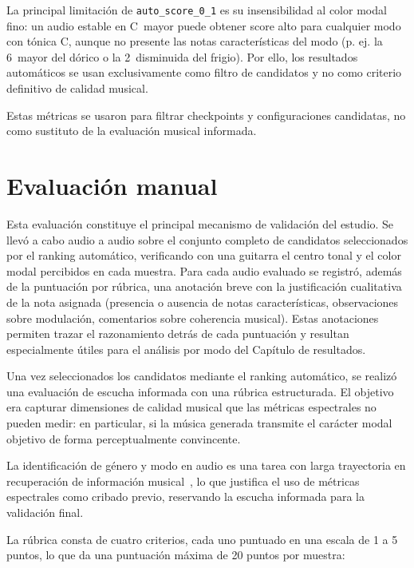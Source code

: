 \documentclass[%
    school=etsisi,%
    type=pfg,%
    degree=61CD,%
]{upm-report}
\begin{document}
La principal limitaci\'on de \texttt{auto\_score\_0\_1} es su insensibilidad al color modal fino: un audio estable en C~mayor puede obtener score alto para cualquier modo con t\'onica C, aunque no presente las notas caracter\'isticas del modo (p. ej. la 6\textordfeminine~mayor del d\'orico o la 2\textordfeminine~disminuida del frigio). Por ello, los resultados autom\'aticos se usan exclusivamente como filtro de candidatos y no como criterio definitivo de calidad musical.

Estas m\'etricas se usaron para filtrar checkpoints y configuraciones candidatas, no como sustituto de la evaluaci\'on musical informada.

\section{Evaluaci\'on manual}

Esta evaluaci\'on constituye el principal mecanismo de validaci\'on del estudio. Se llev\'o a cabo audio a audio sobre el conjunto completo de candidatos seleccionados por el ranking autom\'atico, verificando con una guitarra el centro tonal y el color modal percibidos en cada muestra. Para cada audio evaluado se registr\'o, adem\'as de la puntuaci\'on por r\'ubrica, una anotaci\'on breve con la justificaci\'on cualitativa de la nota asignada (presencia o ausencia de notas caracter\'isticas, observaciones sobre modulaci\'on, comentarios sobre coherencia musical). Estas anotaciones permiten trazar el razonamiento detr\'as de cada puntuaci\'on y resultan especialmente \'utiles para el an\'alisis por modo del Cap\'itulo de resultados.

Una vez seleccionados los candidatos mediante el ranking autom\'atico, se realiz\'o una evaluaci\'on de escucha informada con una r\'ubrica estructurada. El objetivo era capturar dimensiones de calidad musical que las m\'etricas espectrales no pueden medir: en particular, si la m\'usica generada transmite el car\'acter modal objetivo de forma perceptualmente convincente.

La identificaci\'on de g\'enero y modo en audio es una tarea con larga trayectoria en recuperaci\'on de informaci\'on musical~\cite{tzanetakis2002musical}, lo que justifica el uso de m\'etricas espectrales como cribado previo, reservando la escucha informada para la validaci\'on final.

La r\'ubrica consta de cuatro criterios, cada uno puntuado en una escala de 1 a 5 puntos, lo que da una puntuaci\'on m\'axima de 20 puntos por muestra:
\end{document}

